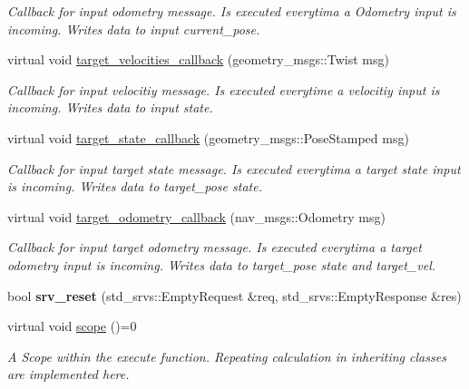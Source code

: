 \begin{DoxyCompactItemize}
\begin{DoxyCompactList}\small\item\em Callback for input odometry message. Is executed everytima a Odometry input is incoming. Writes data to input current\+\_\+pose. \end{DoxyCompactList}\item 
virtual void \hyperlink{classController_afa31080c1ed1e652410c5e97472b3ea5}{target\+\_\+velocities\+\_\+callback} (geometry\+\_\+msgs\+::\+Twist msg)\hypertarget{classController_afa31080c1ed1e652410c5e97472b3ea5}{}\label{classController_afa31080c1ed1e652410c5e97472b3ea5}

\begin{DoxyCompactList}\small\item\em Callback for input velocitiy message. Is executed everytime a velocitiy input is incoming. Writes data to input state. \end{DoxyCompactList}\item 
virtual void \hyperlink{classController_a60f59dd761ce2d41dc9254f87164ded1}{target\+\_\+state\+\_\+callback} (geometry\+\_\+msgs\+::\+Pose\+Stamped msg)\hypertarget{classController_a60f59dd761ce2d41dc9254f87164ded1}{}\label{classController_a60f59dd761ce2d41dc9254f87164ded1}

\begin{DoxyCompactList}\small\item\em Callback for input target state message. Is executed everytima a target state input is incoming. Writes data to target\+\_\+pose state. \end{DoxyCompactList}\item 
virtual void \hyperlink{classController_ad9ccaff0c6f9989bd6c33a3d2179124d}{target\+\_\+odometry\+\_\+callback} (nav\+\_\+msgs\+::\+Odometry msg)\hypertarget{classController_ad9ccaff0c6f9989bd6c33a3d2179124d}{}\label{classController_ad9ccaff0c6f9989bd6c33a3d2179124d}

\begin{DoxyCompactList}\small\item\em Callback for input target odometry message. Is executed everytima a target odometry input is incoming. Writes data to target\+\_\+pose state and target\+\_\+vel. \end{DoxyCompactList}\item 
bool {\bfseries srv\+\_\+reset} (std\+\_\+srvs\+::\+Empty\+Request \&req, std\+\_\+srvs\+::\+Empty\+Response \&res)\hypertarget{classController_ae24861b9ecd088dc3a58db860fc417b1}{}\label{classController_ae24861b9ecd088dc3a58db860fc417b1}

\item 
virtual void \hyperlink{classController_af89e3d7ed87318418f0168727bd98f0f}{scope} ()=0\hypertarget{classController_af89e3d7ed87318418f0168727bd98f0f}{}\label{classController_af89e3d7ed87318418f0168727bd98f0f}

\begin{DoxyCompactList}\small\item\em A Scope within the execute function. Repeating calculation in inheriting classes are implemented here. \end{DoxyCompactList}\end{DoxyCompactItemize}
